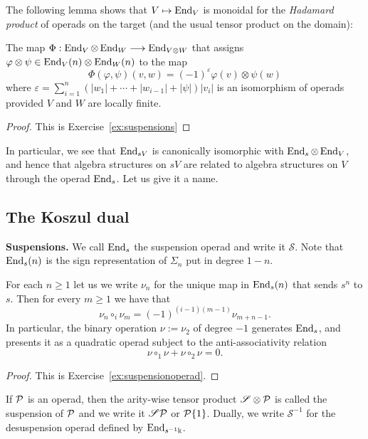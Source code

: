 The following lemma shows that $V\mapsto \operatorname{End}_V$ is 
monoidal for the \emph{Hadamard product} of operads on the
target (and the usual tensor product on the domain): 
 \begin{lemma}\label{lemma:hadamard}
The map $\Phi : \operatorname{End}_V\otimes \operatorname{End}_W\longrightarrow \operatorname{End}_{V\otimes W}$
that assigns $\varphi \otimes \psi \in \operatorname{End}_V(n)\otimes \operatorname{End}_W(n)$
to the map
\[ \Phi(\varphi,\psi)(v,w) = (-1)^\varepsilon \varphi(v)\otimes\psi(w)\]
where $\varepsilon = \sum_{i=1}^n (|w_1| +\cdots + |w_{i-1}|+|\psi|)|v_i|$
is an isomorphism of operads provided $V$ and $W$
are locally finite.
 \end{lemma}
 
 \begin{proof}
 This is Exercise~\ref{ex:suspensions}
 \end{proof}

In particular, we see that $\operatorname{End}_{sV}$ is canonically isomorphic
with $\operatorname{End}_s\otimes \operatorname{End}_V$, and hence that algebra structures on $sV$
are related to algebra structures on $V$ through the operad $\operatorname{End}_s$.
Let us give it a name. 

\subsection{The Koszul dual}

\newcommand{\sus}{\mathscr{S}}
\textbf{Suspensions.} 
We call $\operatorname{End}_{s}$ the suspension operad
and write it $\sus$. Note that $\operatorname{End}_{s}(n)$ is
the sign representation of $\Sigma_n$ put in degree $1-n$.

\begin{proposition} For each $n\geqslant 1$ let us
we write $\nu_n$ for the unique map in $\operatorname{End}_s(n)$ 
that sends $s^n$ to $s$. Then for every $m\geqslant 1$
we have that
\[ \nu_n \circ_i \nu_m = (-1)^{(i-1)(m-1)} \nu_{m+n-1}. \]
In particular, the binary operation $\nu := \nu_2$ of degree
$-1$ generates $\operatorname{End}_s$,
and presents it as a quadratic operad subject to the 
anti-associativity relation
\[ \nu \circ_1\nu + \nu\circ_2 \nu = 0.\]
\end{proposition}
\begin{proof}
 This is Exercise~\ref{ex:suspensionoperad}.
\end{proof}

If ${\mathcal{P}}$ is an operad, then the arity-wise tensor product
$\sus\otimes \PP$ is called the suspension of ${\mathcal{P}}$
and we write it $\sus\PP$ or ${\mathcal{P}}\{1\}$. Dually, we
write $\sus^{-1}$ for the desuspension operad
defined by $\operatorname{End}_{s^{-1}\Bbbk}$. 

